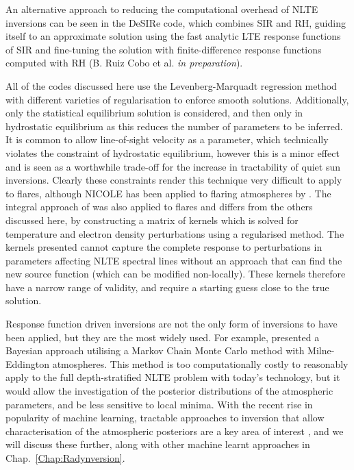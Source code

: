 An alternative approach to reducing the computational overhead of NLTE inversions can be seen in the DeSIRe code, which combines SIR and RH, guiding itself to an approximate solution using the fast analytic LTE response functions of SIR and fine-tuning the solution with finite-difference response functions computed with RH (B. Ruiz Cobo et al. \emph{in preparation}).

All of the codes discussed here use the Levenberg-Marquadt regression method with different varieties of regularisation to enforce smooth solutions.
Additionally, only the statistical equilibrium solution is considered, and then only in hydrostatic equilibrium as this reduces the number of parameters to be inferred.
It is common to allow line-of-sight velocity as a parameter, which technically violates the constraint of hydrostatic equilibrium, however this is a minor effect and is seen as a worthwhile trade-off for the increase in tractability of quiet sun inversions.
Clearly these constraints render this technique very difficult to apply to flares, although NICOLE has been applied to flaring atmospheres by \citet{Kuridze2018}.
The integral approach of \citep{Metcalf1990a} was also applied to flares and differs from the others discussed here, by constructing a matrix of kernels which is solved for temperature and electron density perturbations using a regularised method.
The kernels presented cannot capture the complete response to perturbations in parameters affecting NLTE spectral lines without an approach that can find the new source function (which can be modified non-locally).
These kernels therefore have a narrow range of validity, and require a starting guess close to the true solution.

Response function driven inversions are not the only form of inversions to have been applied, but they are the most widely used.
For example, \citet{AsensioRamos2007} presented a Bayesian approach utilising a Markov Chain Monte Carlo method with Milne-Eddington atmospheres.
This method is too computationally costly to reasonably apply to the full depth-stratified NLTE problem with today's technology, but it would allow the investigation of the posterior distributions of the atmospheric parameters, and be less sensitive to local minima.
With the recent rise in popularity of machine learning, tractable approaches to inversion that allow characterisation of the atmospheric posteriors are a key area of interest \citep[e.g.][]{Osborne2019, DiazBaso2021}, and we will discuss these further, along with other machine learnt approaches in Chap.~\ref{Chap:Radynversion}.


